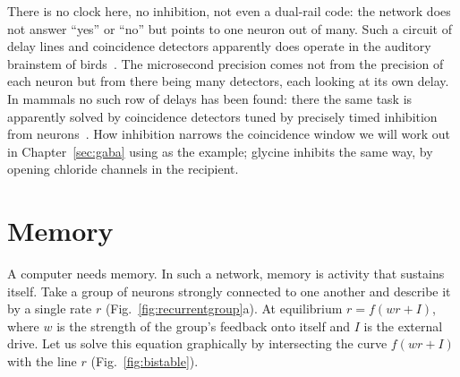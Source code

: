 There is no clock here, no inhibition, not even a dual-rail code: the network does not answer ``yes'' or ``no'' but points to one neuron out of many. Such a circuit of delay lines and coincidence detectors apparently does operate in the auditory brainstem of birds~\cite{Carr1990}. The microsecond precision comes not from the precision of each neuron but from there being many detectors, each looking at its own delay. In mammals no such row of delays has been found: there the same task is apparently solved by coincidence detectors tuned by precisely timed inhibition from  neurons~\cite{Brand2002,Grothe2010}. How inhibition narrows the coincidence window we will work out in Chapter~\ref{sec:gaba} using  as the example; glycine inhibits the same way, by opening chloride channels in the recipient.

\section{Memory}

A computer needs memory. In such a network, memory is activity that sustains itself. Take a group of  neurons strongly connected to one another and describe it by a single rate $r$ (Fig.~\ref{fig:recurrentgroup}a). At equilibrium $r=f(wr+I)$, where $w$ is the strength of the group's feedback onto itself and $I$ is the external drive. Let us solve this equation graphically by intersecting the curve $f(wr+I)$ with the line $r$ (Fig.~\ref{fig:bistable}).

